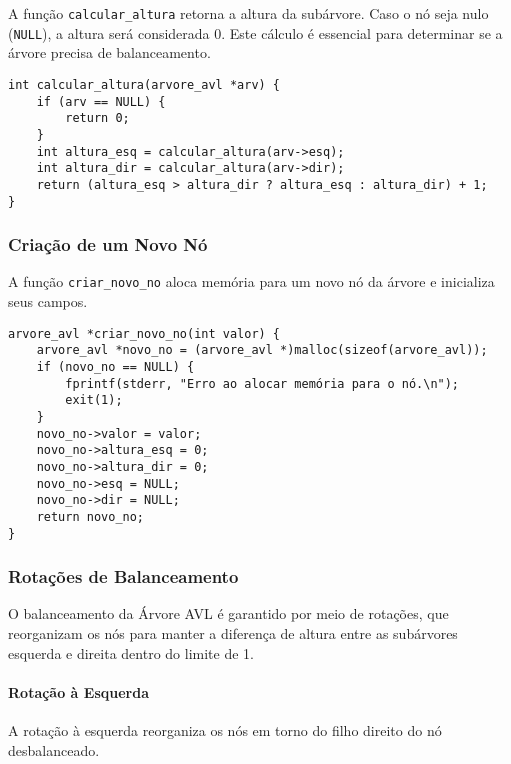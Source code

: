 \vspace{3mm}

A função \texttt{calcular\_altura} retorna a altura da subárvore. Caso o nó seja nulo (\texttt{NULL}), a altura será considerada 0. 
Este cálculo é essencial para determinar se a árvore precisa de balanceamento.

\begin{lstlisting}
int calcular_altura(arvore_avl *arv) {
    if (arv == NULL) {
        return 0;
    }
    int altura_esq = calcular_altura(arv->esq);
    int altura_dir = calcular_altura(arv->dir);
    return (altura_esq > altura_dir ? altura_esq : altura_dir) + 1;
}
\end{lstlisting}

\vspace{3mm}

\subsubsection{Criação de um Novo Nó}

\vspace{3mm}

A função \texttt{criar\_novo\_no} aloca memória para um novo nó da árvore e inicializa seus campos.

\begin{lstlisting}
arvore_avl *criar_novo_no(int valor) {
    arvore_avl *novo_no = (arvore_avl *)malloc(sizeof(arvore_avl));
    if (novo_no == NULL) {
        fprintf(stderr, "Erro ao alocar memória para o nó.\n");
        exit(1);
    }
    novo_no->valor = valor;
    novo_no->altura_esq = 0;
    novo_no->altura_dir = 0;
    novo_no->esq = NULL;
    novo_no->dir = NULL;
    return novo_no;
}
\end{lstlisting}

\vspace{3mm}

\subsubsection{Rotações de Balanceamento}

\vspace{3mm}

O balanceamento da Árvore AVL é garantido por meio de rotações,
que reorganizam os nós para manter a diferença de altura entre as subárvores esquerda e direita dentro do limite de 1.

\paragraph{Rotação à Esquerda}  
A rotação à esquerda reorganiza os nós em torno do filho direito do nó desbalanceado.


